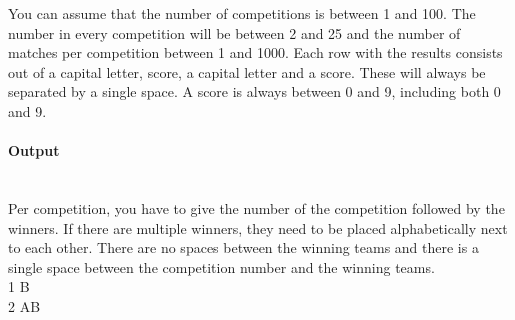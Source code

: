 \documentclass[10pt,a4paper]{article}
\begin{document}
You can assume that the number of competitions is between 1 and 100. The number in every competition will be between 2 and 25 and the number of matches per competition between 1 and 1000. Each row with the results consists out of a capital letter, score, a capital letter and a score. These will always be separated by a single space. A score is always between 0 and 9, including both 0 and 9.
	
\paragraph{Output\\ \\}

Per competition, you have to give the number of the competition followed by the winners. If there are multiple winners, they need to be placed alphabetically next to each other. There are no spaces between the winning teams and there is a single space between the competition number and the winning teams. \\
1 B \\
2 AB \\
\end{document}

